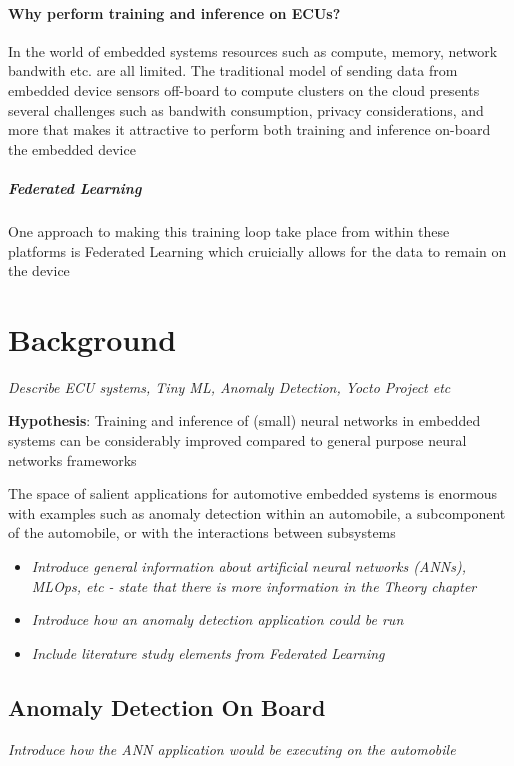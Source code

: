 \subsubsection{Why perform training and inference on ECUs?}

In the world of embedded systems resources such as compute, memory, network bandwith etc. are all limited. The traditional model of sending data from embedded device sensors off-board to compute clusters on the cloud presents several challenges such as bandwith consumption, privacy considerations, and more that makes it attractive to perform both training and inference on-board the embedded device

\paragraph{Federated Learning}{
	One approach to making this training loop take place from within these platforms is Federated Learning which cruicially allows for the data to remain on the device
}

\chapter{Background}
\textit{Describe ECU systems, Tiny ML, Anomaly Detection, Yocto Project etc}

\vspace{1em}
\noindent \textbf{Hypothesis}: Training and inference of (small) neural networks in embedded systems can be considerably improved compared to general purpose neural networks frameworks

The space of salient applications for automotive embedded systems is enormous with examples such as anomaly detection within an automobile, a subcomponent of the automobile, or with the interactions between subsystems

\begin{itemize}
	\item \textit{Introduce general information about artificial neural networks (ANNs), MLOps, etc - state that there is more information in the Theory chapter}
	\item \textit{Introduce how an anomaly detection application could be run}
	\item \textit{Include literature study elements from Federated Learning}
\end{itemize}

\section[Anomaly Detection using Machine Learning]{Anomaly Detection On Board}
\textit{Introduce how the ANN application would be executing on the automobile}

